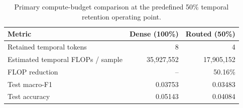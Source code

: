 
\begin{table}[t]
\centering
\caption{Primary compute-budget comparison at the predefined 50\% temporal
retention operating point.}
\label{tab:compute_budget}
\begin{tabular}{lrr}
\toprule
Metric & Dense (100\%) & Routed (50\%)\\
\midrule
Retained temporal tokens & 8 & 4\\
Estimated temporal FLOPs / sample & 35,927,552 & 17,905,152\\
FLOP reduction & -- & 50.16\%\\
Test macro-F1 & 0.03753 & 0.03483\\
Test accuracy & 0.05143 & 0.04084\\
\bottomrule
\end{tabular}
\end{table}
